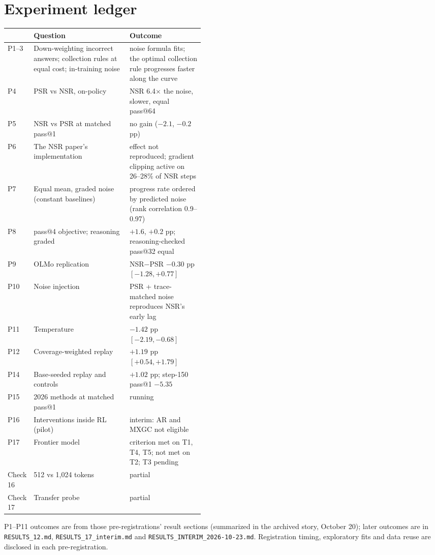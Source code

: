 \documentclass[10pt]{article}
\begin{document}
\section{Experiment ledger}
\begin{center}\scriptsize
\begin{tabularx}{\linewidth}{@{}p{0.07\linewidth} Y p{0.38\linewidth}@{}}
\toprule
& Question & Outcome\\
\midrule
P1--3 & Down-weighting incorrect answers; collection rules at equal cost; in-training noise & noise formula fits; the optimal collection rule progresses faster along the curve\\
P4 & PSR vs NSR, on-policy & NSR 6.4$\times$ the noise, slower, equal pass@64\\
P5 & NSR vs PSR at matched pass@1 & no gain ($-2.1$, $-0.2$ pp)\\
P6 & The NSR paper's implementation & effect not reproduced; gradient clipping active on 26--28\% of NSR steps\\
P7 & Equal mean, graded noise (constant baselines) & progress rate ordered by predicted noise (rank correlation 0.9--0.97)\\
P8 & pass@4 objective; reasoning graded & $+1.6$, $+0.2$ pp; reasoning-checked pass@32 equal\\
P9 & OLMo replication & NSR$-$PSR $-0.30$ pp $[-1.28,+0.77]$\\
P10 & Noise injection & PSR + trace-matched noise reproduces NSR's early lag\\
P11 & Temperature & $-1.42$ pp $[-2.19,-0.68]$\\
P12 & Coverage-weighted replay & $+1.19$ pp $[+0.54,+1.79]$\\
P14 & Base-seeded replay and controls & $+1.02$ pp; step-150 pass@1 $-5.35$\\
P15 & 2026 methods at matched pass@1 & running\\
P16 & Interventions inside RL (pilot) & interim: AR and MXGC not eligible\\
P17 & Frontier model & criterion met on T1, T4, T5; not met on T2; T3 pending\\
Check 16 & 512 vs 1,024 tokens & partial\\
Check 17 & Transfer probe & partial\\
\bottomrule
\end{tabularx}
\end{center}
P1--P11 outcomes are from those pre-registrations' result sections (summarized in the archived story, October 20); later outcomes are in \texttt{RESULTS\_12.md}, \texttt{RESULTS\_17\_interim.md} and \texttt{RESULTS\_INTERIM\_2026-10-23.md}. Registration timing, exploratory fits and data reuse are disclosed in each pre-registration.
\end{document}

